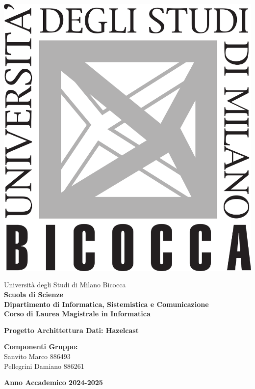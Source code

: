 \setlength\intextsep{0pt}

\noindent
\begin{minipage}{0.2\textwidth}
  \includegraphics[width=5\baselineskip]{images/bicocca_logo.png}
\end{minipage}%
\begin{minipage}{0.8\textwidth}
  Università degli Studi di Milano Bicocca \\[8pt]
  \textbf{Scuola di Scienze} \\[8pt]
  \textbf{Dipartimento di Informatica, Sistemistica e Comunicazione}\\[8pt]
  \textbf{Corso di Laurea Magistrale in Informatica}
\end{minipage}

\vspace{30mm}

\begin{center}
    \Huge
    \textbf{Progetto Archittettura Dati: Hazelcast}
\end{center}

\vspace{60mm}

\large
\noindent
\textbf{Componenti Gruppo:} \\[7pt]
Sanvito Marco 886493 \\[7pt]
Pellegrini Damiano 886261 \\[20pt]

\vspace{35mm}


\begin{center}
\textbf{Anno Accademico 2024-2025}
\end{center}
\newpage
